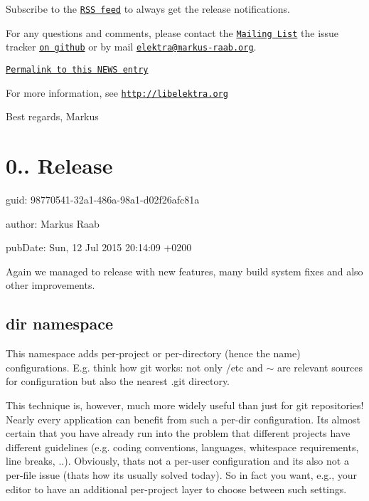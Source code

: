 Subscribe to the \href{http://doc.libelektra.org/news/feed.rss}{\tt R\+S\+S feed} to always get the release notifications.

For any questions and comments, please contact the \href{https://lists.sourceforge.net/lists/listinfo/registry-list}{\tt Mailing List} the issue tracker \href{http://git.libelektra.org/issues}{\tt on github} or by mail \href{mailto:elektra@markus-raab.org}{\tt elektra@markus-\/raab.\+org}.

\href{http://doc.libelektra.org/news/3c00a5f1-c017-4555-92b5-a2cf6e0803e3.html}{\tt Permalink to this N\+E\+W\+S entry}

For more information, see \href{http://libelektra.org}{\tt http\+://libelektra.\+org}

Best regards, Markus

\section*{0.. Release}


\begin{DoxyItemize}
\item guid\+: 98770541-\/32a1-\/486a-\/98a1-\/d02f26afc81a
\item author\+: Markus Raab
\item pub\+Date\+: Sun, 12 Jul 2015 20\+:14\+:09 +0200
\end{DoxyItemize}

Again we managed to release with new features, many build system fixes and also other improvements.

\subsection*{dir namespace}

This namespace adds per-\/project or per-\/directory (hence the name) configurations. E.\+g. think how git works\+: not only /etc and $\sim$ are relevant sources for configuration but also the nearest .git directory.

This technique is, however, much more widely useful than just for git repositories! Nearly every application can benefit from such a per-\/dir configuration. Its almost certain that you have already run into the problem that different projects have different guidelines (e.\+g. coding conventions, languages, whitespace requirements, line breaks, ..). Obviously, thats not a per-\/user configuration and its also not a per-\/file issue (thats how its usually solved today). So in fact you want, e.\+g., your editor to have an additional per-\/project layer to choose between such settings.

